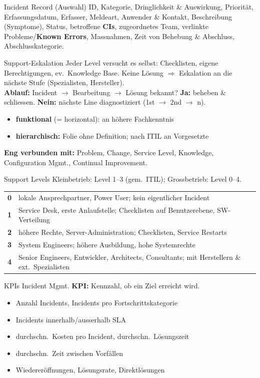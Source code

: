 \documentclass[a4paper, fontsize=7pt]{scrartcl}
\renewcommand*{\arraystretch}{1.5}  %
\begin{document}
\begin{subbox}{Incident Record (Auswahl)}
ID, Kategorie, Dringlichkeit \& Auswirkung, Priorität, Erfassungsdatum, Erfasser,
Meldeart, Anwender \& Kontakt, Beschreibung (Symptome), Status, betroffene
\textbf{CIs}, zugeordnetes Team, verlinkte Probleme/\textbf{Known Errors},
Massnahmen, Zeit von Behebung \& Abschluss, Abschlusskategorie.
\end{subbox}

\begin{mainbox}{Support-Eskalation}
Jeder Level versucht es selbst: Checklisten, eigene Berechtigungen, ev.\
Knowledge Base. Keine Lösung $\Rightarrow$ Eskalation an die nächste Stufe
(Spezialisten, Hersteller).\\
\textbf{Ablauf:} Incident $\to$ Bearbeitung $\to$ Lösung bekannt?
\textbf{Ja:} beheben \& schliessen. \textbf{Nein:} nächste Line diagnostiziert
(1st $\to$ 2nd $\to$ n).
\begin{itemize}
    \item \textbf{funktional} (= horizontal): an höhere Fachkenntnis
    \item \textbf{hierarchisch:} Folie ohne Definition; nach ITIL an
          Vorgesetzte
\end{itemize}
\textbf{Eng verbunden mit:} Problem, Change, Service Level, Knowledge,
Configuration Mgmt., Continual Improvement.
\end{mainbox}

\begin{mainbox}{Support Levels}
Kleinbetrieb: Level 1--3 (gem.\ ITIL); Grossbetrieb: Level 0--4.
\renewcommand*{\arraystretch}{1.15}
\begin{tabularx}{\linewidth}{@{}l|>{\raggedright\arraybackslash}X@{}}
\textbf{0} & lokale Ansprechpartner, Power User; kein eigentlicher Incident \\
\textbf{1} & Service Desk, erste Anlaufstelle; Checklisten auf Benutzerebene,
  SW-Verteilung \\
\textbf{2} & höhere Rechte, Server-Administration; Checklisten, Service Restarts \\
\textbf{3} & System Engineers; höhere Ausbildung, hohe Systemrechte \\
\textbf{4} & Senior Engineers, Entwickler, Architects, Consultants; mit Herstellern
  \& ext.\ Spezialisten \\
\end{tabularx}
\end{mainbox}

\begin{mainbox}{KPIs Incident Mgmt.}
\textbf{KPI:} Kennzahl, ob ein Ziel erreicht wird.
\begin{itemize}
    \item Anzahl Incidents, Incidents pro Fortschrittskategorie
    \item Incidents innerhalb/ausserhalb SLA
    \item durchschn.\ Kosten pro Incident, durchschn.\ Lösungszeit
    \item durchschn.\ Zeit zwischen Vorfällen
    \item Wiedereröffnungen, Lösungsrate, Direktlösungen
\end{itemize}
\end{mainbox}
\end{document}

